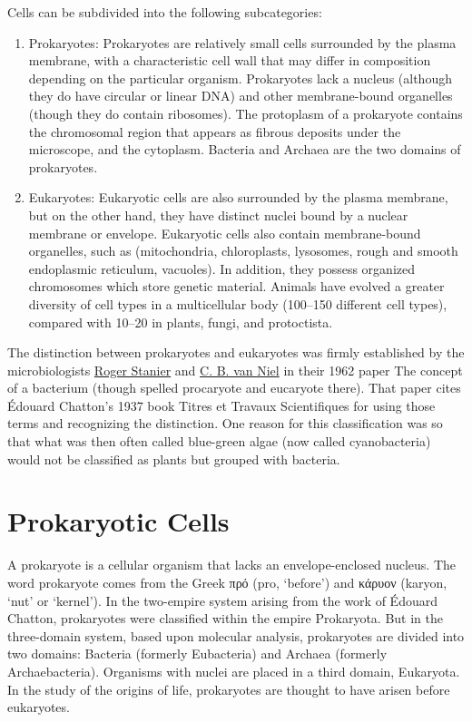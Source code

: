 Cells can be subdivided into the following subcategories:

\begin{enumerate}
\def\labelenumi{\arabic{enumi}.}
\tightlist
\item
  Prokaryotes: Prokaryotes are relatively small cells surrounded by the plasma membrane, with a characteristic cell wall that may differ in composition depending on the particular organism. Prokaryotes lack a nucleus (although they do have circular or linear DNA) and other membrane-bound organelles (though they do contain ribosomes). The protoplasm of a prokaryote contains the chromosomal region that appears as fibrous deposits under the microscope, and the cytoplasm. Bacteria and Archaea are the two domains of prokaryotes.
\item
  Eukaryotes: Eukaryotic cells are also surrounded by the plasma membrane, but on the other hand, they have distinct nuclei bound by a nuclear membrane or envelope. Eukaryotic cells also contain membrane-bound organelles, such as (mitochondria, chloroplasts, lysosomes, rough and smooth endoplasmic reticulum, vacuoles). In addition, they possess organized chromosomes which store genetic material.
  Animals have evolved a greater diversity of cell types in a multicellular body (100--150 different cell types), compared with 10--20 in plants, fungi, and protoctista.
\end{enumerate}

The distinction between prokaryotes and eukaryotes was firmly established by the microbiologists \href{https://en.wikipedia.org/wiki/Roger_Stanier}{Roger Stanier} and \href{https://en.wikipedia.org/wiki/C._B._van_Niel}{C. B. van Niel} in their 1962 paper The concept of a bacterium (though spelled procaryote and eucaryote there). That paper cites Édouard Chatton's 1937 book Titres et Travaux Scientifiques for using those terms and recognizing the distinction. One reason for this classification was so that what was then often called blue-green algae (now called cyanobacteria) would not be classified as plants but grouped with bacteria.

\hypertarget{prokaryotic-cells}{%
\section{Prokaryotic Cells}\label{prokaryotic-cells}}

A prokaryote is a cellular organism that lacks an envelope-enclosed nucleus. The word prokaryote comes from the Greek πρό (pro, `before') and κάρυον (karyon, `nut' or `kernel'). In the two-empire system arising from the work of Édouard Chatton, prokaryotes were classified within the empire Prokaryota. But in the three-domain system, based upon molecular analysis, prokaryotes are divided into two domains: Bacteria (formerly Eubacteria) and Archaea (formerly Archaebacteria). Organisms with nuclei are placed in a third domain, Eukaryota. In the study of the origins of life, prokaryotes are thought to have arisen before eukaryotes.

